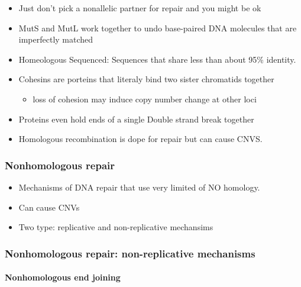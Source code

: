 \documentclass[]{book}
\providecommand{\tightlist}{%
  \setlength{\itemsep}{0pt}\setlength{\parskip}{0pt}}
\let\oldparagraph\paragraph
\renewcommand{\paragraph}[1]{\oldparagraph{#1}\mbox{}}
\begin{document}
\begin{itemize}
\tightlist
\item
  Just don't pick a nonallelic partner for repair and you might be ok
\item
  MutS and MutL work together to undo base-paired DNA molecules that are imperfectly matched
\item
  Homeologous Sequenced: Sequences that share less than about 95\% identity.
\item
  Cohesins are porteins that literaly bind two sister chromatids together

  \begin{itemize}
  \tightlist
  \item
    loss of cohesion may induce copy number change at other loci
  \end{itemize}
\item
  Proteins even hold ends of a single Double strand break together
\item
  Homologous recombination is dope for repair but can cause CNVS.
\end{itemize}

\hypertarget{nonhomologous-repair}{%
\subsubsection{Nonhomologous repair}\label{nonhomologous-repair}}

\begin{itemize}
\tightlist
\item
  Mechanisms of DNA repair that use very limited of NO homology.
\item
  Can cause CNVs
\item
  Two type: replicative and non-replicative mechansims
\end{itemize}

\hypertarget{nonhomologous-repair-non-replicative-mechanisms}{%
\subsubsection{Nonhomologous repair: non-replicative mechanisms}\label{nonhomologous-repair-non-replicative-mechanisms}}

\hypertarget{nonhomologous-end-joining}{%
\paragraph{Nonhomologous end joining}\label{nonhomologous-end-joining}}
\end{document}
